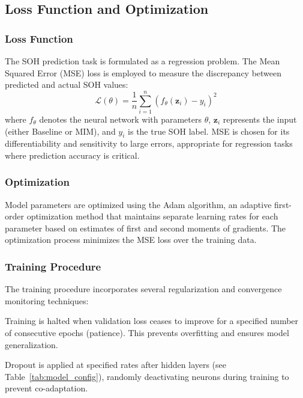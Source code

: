 \documentclass[5p,times]{elsarticle}
\begin{document}
\subsection{Loss Function and Optimization}\label{sec:optimization}

\subsubsection{Loss Function}

The SOH prediction task is formulated as a regression problem. The Mean Squared Error (MSE) loss is employed to measure the discrepancy between predicted and actual SOH values:
\begin{equation}
    \mathcal{L}(\theta) = \frac{1}{n} \sum_{i=1}^{n} \left( f_{\theta}(\mathbf{z}_i) - y_i \right)^2
\end{equation}
where $f_{\theta}$ denotes the neural network with parameters $\theta$, $\mathbf{z}_i$ represents the input (either Baseline or MIM), and $y_i$ is the true SOH label. MSE is chosen for its differentiability and sensitivity to large errors, appropriate for regression tasks where prediction accuracy is critical.

\subsubsection{Optimization}

Model parameters are optimized using the Adam algorithm, an adaptive first-order optimization method that maintains separate learning rates for each parameter based on estimates of first and second moments of gradients. The optimization process minimizes the MSE loss over the training data.

\subsubsection{Training Procedure}

The training procedure incorporates several regularization and convergence monitoring techniques:

Training is halted when validation loss ceases to improve for a specified number of consecutive epochs (patience). This prevents overfitting and ensures model generalization.

Dropout is applied at specified rates after hidden layers (see Table~\ref{tab:model_config}), randomly deactivating neurons during training to prevent co-adaptation.
\end{document}

